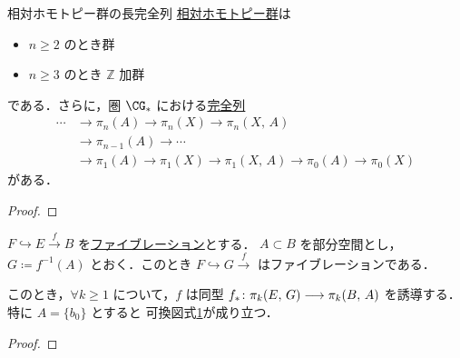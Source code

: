 \documentclass[algtopo_main]{subfiles}
\begin{document}
\begin{mytheo}[label=ES:rel-homotopy]{相対ホモトピー群の長完全列}
    \hyperref[def:rel-homotopy-group]{相対ホモトピー群}は
    \begin{itemize}
        \item $n \ge 2$ のとき群
        \item $n \ge 3$ のとき $\mathbb{Z}$ 加群
    \end{itemize}
    である．さらに，圏 $\CG_*$ における\hyperref[def:ES-SETS]{完全列}
    \begin{align}
        \cdots &\to \pi_n (A) \to \pi_n (X) \to \pi_n (X,\, A) \\
        &\to \pi_{n-1} (A) \to \cdots \\
        &\to \pi_1 (A) \to \pi_1 (X) \to \pi_1 (X,\, A) \to \pi_0 (A) \to \pi_0(X)
    \end{align}
    がある．
\end{mytheo}

\begin{proof}
    
\end{proof}

\begin{mylem}[]{}
    $F \hookrightarrow E \xrightarrow{f} B$ を\hyperref[def:fibration]{ファイブレーション}とする．
    $A \subset B$ を部分空間とし，$G \coloneqq f^{-1}(A)$ とおく．このとき $F \hookrightarrow G \xrightarrow{f}$ はファイブレーションである．

    このとき，$\forall k \ge 1$ について，$f$ は同型 $f_* \colon \pi_k(E,\, G) \longrightarrow \pi_k(B,\, A)$ を誘導する．特に $A = \{b_0\}$ とすると
    可換図式\ref{cmtd:rel-homotopy-ladder}が成り立つ．
\end{mylem}

\begin{figure}[H]
    \centering
    \caption{}
    \label{cmtd:rel-homotopy-ladder}
\end{figure}%

\begin{proof}
    
\end{proof}
\end{document}
